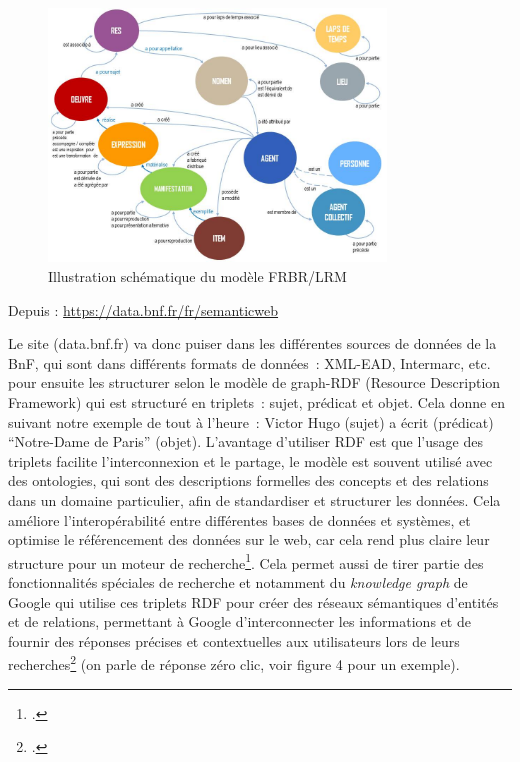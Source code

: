 \begin{figure}[h!]
	\centering
	\includegraphics[width=0.8\textwidth]{images/image3.jpg}
	\caption{Illustration schématique du modèle FRBR/LRM}
	\label{fig:image3}
\end{figure}

\begin{center}
	Depuis : \url{https://data.bnf.fr/fr/semanticweb}
\end{center}



Le site (data.bnf.fr) va donc puiser dans les différentes sources de données de la BnF, qui sont dans différents formats de données : XML-EAD, Intermarc, etc. pour ensuite les structurer selon le modèle de graph-RDF (Resource Description Framework) qui est structuré en triplets : sujet, prédicat et objet. Cela donne en suivant notre exemple de tout à l’heure : Victor Hugo (sujet) a écrit (prédicat) \enquote{Notre-Dame de Paris} (objet). L’avantage d’utiliser RDF est que l’usage des triplets facilite l’interconnexion et le partage, le modèle est souvent utilisé avec des ontologies, qui sont des descriptions formelles des concepts et des relations dans un domaine particulier, afin de standardiser et structurer les données. Cela améliore l’interopérabilité entre différentes bases de données et systèmes, et optimise le référencement des données sur le web, car cela rend plus claire leur structure pour un moteur de recherche\footcite{zotero-238}. Cela permet aussi de tirer partie des fonctionnalités spéciales de recherche et notamment du \textit{knowledge graph} de Google qui utilise ces triplets RDF pour créer des réseaux sémantiques d'entités et de relations, permettant à Google d'interconnecter les informations et de fournir des réponses précises et contextuelles aux utilisateurs lors de leurs recherches\footcite{google2012} (on parle de réponse zéro clic, voir figure 4 pour un exemple).


